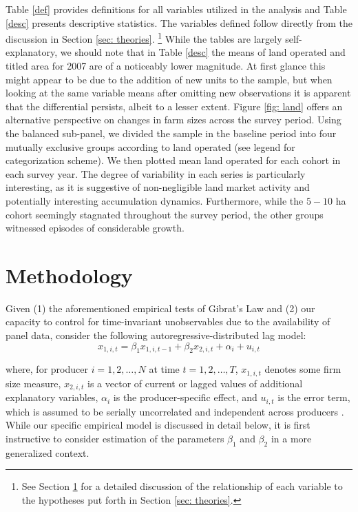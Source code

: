 \documentclass[english]{article}
\begin{document}
Table \ref{def} provides definitions for all variables utilized in the analysis 
and Table \ref{desc} presents descriptive statistics. 
The variables defined follow directly from the discussion in Section 
\ref{sec: theories}.%
\footnote{See Section \ref{sec: methodology} for a detailed 
discussion of the relationship of each variable to the hypotheses
put forth in Section \ref{sec: theories}.}
While the tables are largely self-explanatory, we should note that in Table 
\ref{desc} the means of land operated and titled area for 2007 are of a 
noticeably lower magnitude. 
At first glance this might appear to be due to the addition of new units to the 
sample, but when looking at the same variable means after omitting new 
observations it is apparent that the differential persists, albeit to a lesser 
extent.
Figure \ref{fig: land} offers an alternative perspective on changes in farm sizes 
across the survey period.
Using the balanced sub-panel, we divided the sample in the baseline period 
into four mutually exclusive groups according to land operated (see legend for 
categorization scheme).
We then plotted mean land operated for each cohort in each survey year.
The degree of variability in each series is particularly interesting, as it is 
suggestive of non-negligible land market activity and potentially interesting
accumulation dynamics.
Furthermore, while the $5-10$ ha cohort seemingly stagnated throughout the 
survey period, the other groups witnessed episodes of considerable growth.


\section{Methodology}
\label{sec: methodology}

Given (1) the aforementioned empirical tests of Gibrat's Law and (2) our capacity to control for time-invariant unobservables due to the availability of panel data, consider the following autoregressive-distributed lag model: 
\begin{equation}
x_{1,i,t} = \beta_1 x_{1,i,t-1} + \beta_2 x_{2,i,t} + \alpha_i +  u_{i,t}
\label{adl}
\end{equation}

\noindent
where, for producer $i=1,2,\ldots,N$ at time $t=1,2,\ldots,T$, $x_{1,i,t}$ denotes some firm size measure, $x_{2,i,t}$ is a vector of current or lagged values of additional explanatory variables, $\alpha_i$ is the producer-specific effect, and $u_{i,t}$ is the error term, which is assumed to be serially uncorrelated and independent across producers \citep{bond2002}. While our specific empirical model is discussed in detail below, it is first instructive to consider estimation of the parameters $\beta_1$ and $\beta_2$ in a more generalized context.
\end{document}
